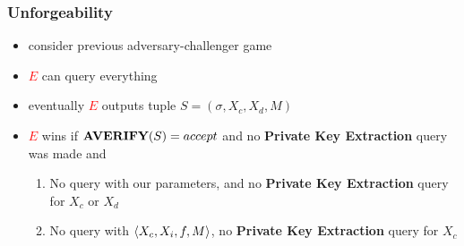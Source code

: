 \begin{frame}
	\frametitle{Unforgeability}

	\begin{itemize}[<+->]
		\item consider previous adversary-challenger game
		\item \textcolor{Red}{$E$} can query everything 
		\item eventually \textcolor{Red}{$E$} outputs tuple $S = (\sigma, X_c, X_d, M)$ 
		\item \textcolor{Red}{$E$} wins if $\textbf{AVERIFY}(S) = accept$ and no \textbf{Private Key Extraction} query was made and
      \begin{enumerate}
        \item No \asign query with our parameters, and no \textbf{Private Key Extraction} query for $X_c$ or $X_d$ 
	     	\item No \asign query with $\langle X_c, X_i, f, M \rangle$, no \textbf{Private Key Extraction} query for $X_c$
      \end{enumerate}
  \end{itemize}
\end{frame}